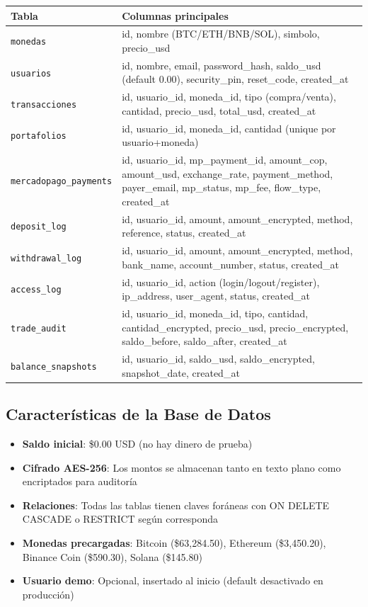 \documentclass[12pt,oneside]{article}
\begin{document}
\begin{longtable}{|p{3.5cm}|p{11cm}|}
\hline
\textbf{Tabla} & \textbf{Columnas principales} \\
\hline
\texttt{monedas} & id, nombre (BTC/ETH/BNB/SOL), simbolo, precio\_usd \\
\hline
\texttt{usuarios} & id, nombre, email, password\_hash, saldo\_usd (default 0.00), security\_pin, reset\_code, created\_at \\
\hline
\texttt{transacciones} & id, usuario\_id, moneda\_id, tipo (compra/venta), cantidad, precio\_usd, total\_usd, created\_at \\
\hline
\texttt{portafolios} & id, usuario\_id, moneda\_id, cantidad (unique por usuario+moneda) \\
\hline
\texttt{mercadopago\_payments} & id, usuario\_id, mp\_payment\_id, amount\_cop, amount\_usd, exchange\_rate, payment\_method, payer\_email, mp\_status, mp\_fee, flow\_type, created\_at \\
\hline
\texttt{deposit\_log} & id, usuario\_id, amount, amount\_encrypted, method, reference, status, created\_at \\
\hline
\texttt{withdrawal\_log} & id, usuario\_id, amount, amount\_encrypted, method, bank\_name, account\_number, status, created\_at \\
\hline
\texttt{access\_log} & id, usuario\_id, action (login/logout/register), ip\_address, user\_agent, status, created\_at \\
\hline
\texttt{trade\_audit} & id, usuario\_id, moneda\_id, tipo, cantidad, cantidad\_encrypted, precio\_usd, precio\_encrypted, saldo\_before, saldo\_after, created\_at \\
\hline
\texttt{balance\_snapshots} & id, usuario\_id, saldo\_usd, saldo\_encrypted, snapshot\_date, created\_at \\
\hline
\end{longtable}

\subsection{Características de la Base de Datos}

\begin{itemize}
    \item \textbf{Saldo inicial}: \$0.00 USD (no hay dinero de prueba)
    \item \textbf{Cifrado AES-256}: Los montos se almacenan tanto en texto plano como encriptados para auditoría
    \item \textbf{Relaciones}: Todas las tablas tienen claves foráneas con ON DELETE CASCADE o RESTRICT según corresponda
    \item \textbf{Monedas precargadas}: Bitcoin (\$63,284.50), Ethereum (\$3,450.20), Binance Coin (\$590.30), Solana (\$145.80)
    \item \textbf{Usuario demo}: Opcional, insertado al inicio (default desactivado en producción)
\end{itemize}
\end{document}
